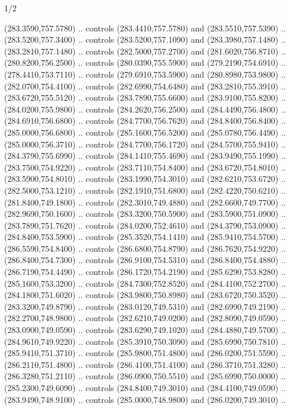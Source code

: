 \begin{flagdescription}{1/2}
\begin{scope}[xshift=0.5\flaglength]
\begin{scope}[scale=0.00745\flagwidth,xshift=-12.1mm,yshift=41.7mm]
\begin{scope}[y=0.80pt, x=0.80pt, yscale=-1, xscale=1, inner sep=0pt, outer sep=0pt]
\begin{scope}[cm={{1.33333,0.0,0.0,-1.33333,(0.0,114.66667)}}]
\begin{scope}[scale=0.100]
  (283.3590,757.5780) .. controls (283.4410,757.5780) and (283.5510,757.5390) ..
  (283.5200,757.3400) .. controls (283.5200,757.1090) and (283.3980,757.1480) ..
  (283.2810,757.1480) .. controls (282.5000,757.2700) and (281.6020,756.8710) ..
  (280.8200,756.2500) .. controls (280.0390,755.5900) and (279.2190,754.6910) ..
  (278.4410,753.7110) .. controls (279.6910,753.5900) and (280.8980,753.9800) ..
  (282.0700,754.4100) .. controls (282.6990,754.6480) and (283.2810,755.3910) ..
  (283.6720,755.5120) .. controls (283.7890,755.6600) and (283.9100,755.8200) ..
  (284.0200,755.9800) .. controls (284.2620,756.2500) and (284.4490,756.4800) ..
  (284.6910,756.6800) .. controls (284.7700,756.7620) and (284.8400,756.8400) ..
  (285.0000,756.6800) .. controls (285.1600,756.5200) and (285.0780,756.4490) ..
  (285.0000,756.3710) .. controls (284.7700,756.1720) and (284.5700,755.9410) ..
  (284.3790,755.6990) .. controls (284.1410,755.4690) and (283.9490,755.1990) ..
  (283.7500,754.9220) .. controls (283.7110,754.8400) and (283.6720,754.8010) ..
  (283.5900,754.8010) .. controls (283.1990,754.3010) and (282.6210,753.6720) ..
  (282.5000,753.1210) .. controls (282.1910,751.6800) and (282.4220,750.6210) ..
  (281.8400,749.1800) .. controls (282.3010,749.4880) and (282.6600,749.7700) ..
  (282.9690,750.1600) .. controls (283.3200,750.5900) and (283.5900,751.0900) ..
  (283.7890,751.7620) .. controls (284.0200,752.4610) and (284.3790,753.0900) ..
  (284.8400,753.5900) .. controls (285.3520,754.1410) and (285.9410,754.5700) ..
  (286.5590,754.8400) .. controls (286.6800,754.8790) and (286.7620,754.9220) ..
  (286.8400,754.7300) .. controls (286.9100,754.5310) and (286.8400,754.4880) ..
  (286.7190,754.4490) .. controls (286.1720,754.2190) and (285.6290,753.8280) ..
  (285.1600,753.3200) .. controls (284.7300,752.8520) and (284.4100,752.2700) ..
  (284.1800,751.6020) .. controls (283.9800,750.8980) and (283.6720,750.3520) ..
  (283.3200,749.8790) .. controls (283.0120,749.5310) and (282.6990,749.2190) ..
  (282.2700,748.9800) .. controls (282.6210,749.0200) and (282.8090,749.0590) ..
  (283.0900,749.0590) .. controls (283.6290,749.1020) and (284.4880,749.5700) ..
  (284.9610,749.9220) .. controls (285.3910,750.3090) and (285.6990,750.7810) ..
  (285.9410,751.3710) .. controls (285.9800,751.4800) and (286.0200,751.5590) ..
  (286.2110,751.4800) .. controls (286.4100,751.4100) and (286.3710,751.3280) ..
  (286.3280,751.2110) .. controls (286.0900,750.5510) and (285.6990,750.0000) ..
  (285.2300,749.6090) .. controls (284.8400,749.3010) and (284.4100,749.0590) ..
  (283.9490,748.9100) .. controls (285.0000,748.9800) and (286.0200,749.3010) ..

\end{scope}
\end{scope}
\end{scope}
\end{scope}
\end{scope}
\end{flagdescription}
